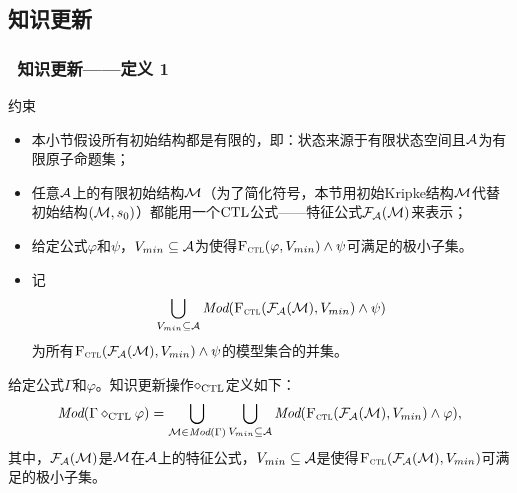 \documentclass[9pt, CJK]{beamer}
\begin{document}
\subsection{知识更新}
\begin{frame}
	\frametitle{~知识更新——{\footnotesize 定义 1}}
	{\footnotesize
		\begin{block}{约束}
			\begin{itemize}
				\item 本小节假设所有初始结构都是有限的，即：状态来源于有限状态空间且${\cal A}$为有限原子命题集；
				\item 任意${\cal A}$上的有限初始结构${\cal M}$（为了简化符号，本节用初始Kripke结构${\cal M}$代替初始结构$({\cal M},s_0)$）都能用一个$\textrm{CTL}$公式——特征公式${\cal F}_{{\cal A}}({\cal M})$来表示；
				\item 给定公式$\varphi$和$\psi$，$V_{min}\subseteq {\cal A}$为使得${\textsc{F}_{\textsc{ctl}}}(\varphi, V_{min}) \wedge \psi$可满足的极小子集。
				\item 记
				$$\bigcup_{V_{min}\subseteq {\cal A}} \textit{Mod}({\textsc{F}_{\textsc{ctl}}}({\cal F}_{{\cal A}}({\cal M}), V_{min}) \wedge \psi)$$
				为所有${\textsc{F}_{\textsc{ctl}}}({\cal F}_{{\cal A}}({\cal M}), V_{min}) \wedge \psi$的模型集合的并集。
			\end{itemize}
		\end{block}
	
	\begin{definition}\label{def:KU}
		给定公式$\Gamma$和$\varphi$。知识更新操作$\diamond_{\textrm{CTL}}$定义如下：
		\[
		\textit{Mod}(\Gamma \diamond_{\textrm{CTL}} \varphi) = \bigcup_{{\cal M} \in \textit{Mod}(\Gamma)} \bigcup_{V_{min}\subseteq {\cal A}} \textit{Mod}({\textsc{F}_{\textsc{ctl}}}({\cal F}_{{\cal A}}({\cal M}), V_{min}) \wedge \varphi),
		\]
		其中，${\cal F}_{{\cal A}}({\cal M})$是${\cal M}$在${\cal A}$上的特征公式，$V_{min} \subseteq {\cal A}$是使得${\textsc{F}_{\textsc{ctl}}}({\cal F}_{{\cal A}}({\cal M}), V_{min})$可满足的极小子集。
	\end{definition}
	}
\end{frame}
\end{document}
